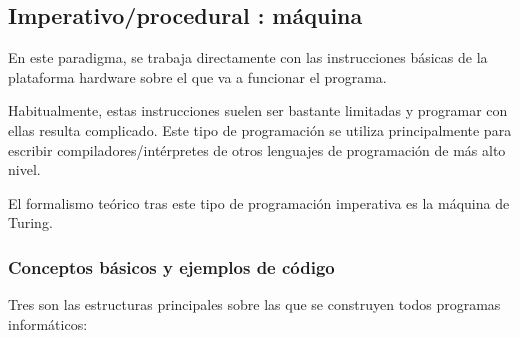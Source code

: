 \documentclass[spanish,12pt,a4paper,final,oneside]{book}
\begin{document}
\subsection{Imperativo/procedural : máquina}
En este paradigma, se trabaja directamente con las instrucciones básicas de la plataforma hardware sobre el que va a funcionar el programa.

Habitualmente, estas instrucciones suelen ser bastante limitadas y programar con ellas resulta complicado. Este tipo de programación se utiliza principalmente para escribir compiladores/intérpretes de otros lenguajes de programación de más alto nivel.

El formalismo teórico tras este tipo de programación imperativa es la máquina de Turing.

\subsubsection*{Conceptos básicos y ejemplos de código}
Tres son las estructuras principales sobre las que se construyen todos programas informáticos:
\end{document}
